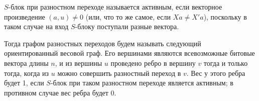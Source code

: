 \documentclass[a4paper,14pt]{extarticle}
\begin{document}
$S$-блок при разностном переходе называется активным, если векторное произведение $(a, u) \neq 0$ (или, что то же самое, если $Xa \neq X'a$), поскольку в таком случае на вход $S$-блоку поступали разные вектора.

Тогда графом разностных переходов будем называть следующий ориентированный весовой граф. Его вершинами являются всевозможные битовые вектора длины $n$, и из вершины $u$ проведено ребро в вершину $v$ тогда и только тогда, когда из $u$ можно совершить разностный переход в $v$. Вес у этого ребра будет 1, если $S$-блок при таком разностном переходе является активным; в противном случае вес ребра будет 0.
\end{document}
